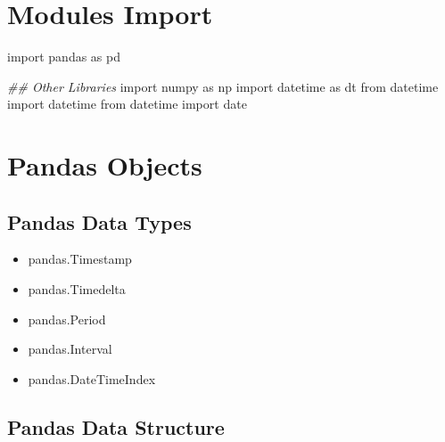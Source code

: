 \documentclass[
]{book}
\newenvironment{Shaded}{\begin{snugshade}}{\end{snugshade}}
\newcommand{\CommentTok}[1]{\textcolor[rgb]{0.37,0.37,0.37}{\textit{#1}}}
\newcommand{\ImportTok}[1]{#1}
\newcommand{\NormalTok}[1]{#1}
\providecommand{\tightlist}{%
  \setlength{\itemsep}{0pt}\setlength{\parskip}{0pt}}
\begin{document}
\hypertarget{modules-import}{%
\section{Modules Import}\label{modules-import}}

\begin{Shaded}
\begin{Highlighting}[]
\ImportTok{import}\NormalTok{ pandas }\ImportTok{as}\NormalTok{ pd}

\CommentTok{\#\# Other Libraries}
\ImportTok{import}\NormalTok{ numpy }\ImportTok{as}\NormalTok{ np}
\ImportTok{import}\NormalTok{ datetime }\ImportTok{as}\NormalTok{ dt}
\ImportTok{from}\NormalTok{ datetime }\ImportTok{import}\NormalTok{ datetime}
\ImportTok{from}\NormalTok{ datetime }\ImportTok{import}\NormalTok{ date}
\end{Highlighting}
\end{Shaded}

\hypertarget{pandas-objects}{%
\section{Pandas Objects}\label{pandas-objects}}

\hypertarget{pandas-data-types}{%
\subsection{Pandas Data Types}\label{pandas-data-types}}

\begin{itemize}
\tightlist
\item
  pandas.Timestamp
\item
  pandas.Timedelta
\item
  pandas.Period
\item
  pandas.Interval
\item
  pandas.DateTimeIndex
\end{itemize}

\hypertarget{pandas-data-structure}{%
\subsection{Pandas Data Structure}\label{pandas-data-structure}}
\end{document}
